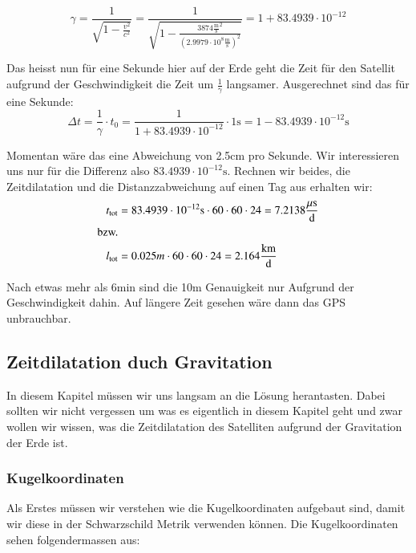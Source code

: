 \begin{refsection}
\begin{equation}
\gamma = \frac{1}{\sqrt{1 - \frac{v^2}{c^2}}} = \frac{1}{\sqrt{1 - \frac{3874 \frac{\text{m}}{\text{s}}^2}{(2.9979 \cdot 10^8 \frac{\text{m}}{\text{s}} )^2}}} = 1 + 83.4939 \cdot 10^{-12}
\end{equation}

\noindent{}Das heisst nun für eine Sekunde hier auf der Erde geht die Zeit für den Satellit aufgrund der Geschwindigkeit die Zeit um \( \frac{1}{\gamma}\) langsamer. Ausgerechnet sind das für eine Sekunde: \\

\begin{equation}
\Delta t = \frac{1}{\gamma} \cdot t_0 = \frac{1}{1 + 83.4939 \cdot 10^{-12}} \cdot 1\text{s} = 1 - 83.4939 \cdot 10^{-12}\text{s}
\end{equation}

\noindent{}Momentan wäre das eine Abweichung von 2.5cm pro Sekunde. Wir interessieren uns nur für die Differenz also \( 83.4939 \cdot 10^{-12}\text{s} \). Rechnen wir beides, die Zeitdilatation und die Distanzzabweichung auf einen Tag aus erhalten wir:
\begin{align*}
t_{\text{tot}} &= 83.4939 \cdot 10^{-12}\text{s} \cdot 60 \cdot 60 \cdot 24 = 7.2138 \frac{\mu \text{s}}{\text{d}}
\\
\textnormal{bzw.}
\\
l_{\text{tot}} &= 0.025m \cdot 60 \cdot 60 \cdot 24 = 2.164 \frac{\text{km}}{\text{d}}
\end{align*}

\noindent{}Nach etwas mehr als 6min sind die 10m Genauigkeit nur Aufgrund der Geschwindigkeit dahin. Auf längere Zeit gesehen wäre dann das GPS unbrauchbar.

\subsection{Zeitdilatation duch Gravitation}
In diesem Kapitel müssen wir uns langsam an die Lösung herantasten. Dabei sollten wir nicht vergessen um was es eigentlich in diesem Kapitel geht und zwar wollen wir wissen, was die Zeitdilatation des Satelliten aufgrund der Gravitation der Erde ist.

\subsubsection{Kugelkoordinaten}
Als Erstes müssen wir verstehen wie die Kugelkoordinaten aufgebaut sind, damit wir diese in der Schwarzschild Metrik verwenden können. Die Kugelkoordinaten sehen folgendermassen aus:


\end{refsection}
